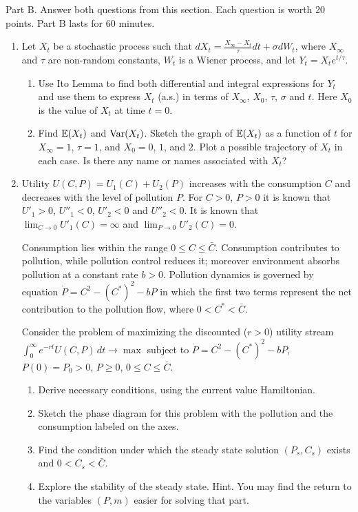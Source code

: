 \documentclass[pdftex,12pt,a4paper]{article}
\begin{document}
Part B.
Answer both questions from this section. Each question is worth 20 points.
Part B lasts for 60 minutes.
\begin{enumerate}[resume]
\item Let $X_t$ be a stochastic process such that
$dX_t=\frac{X_{\infty}-X_t}{\tau}dt+\sigma dW_t$, where $X_{\infty}$ and $\tau$ are non-random constants, $W_t$ is a Wiener process, and let $Y_t=X_t e^{t/\tau}$.
\begin{enumerate}
\item Use Ito Lemma to find both differential and integral expressions for $Y_t$ and use them to express $X_t$ (a.s.) in terms of $X_{\infty}$, $X_0$, $\tau$, $\sigma$ and $t$. Here $X_0$ is the value of $X_t$ at time $t=0$.
\item Find $\mathbb{E}(X_t)$ and $\operatorname{Var}(X_t)$. Sketch the graph of $\mathbb{E}(X_t)$ as a function of $t$ for $X_{\infty}=1$, $\tau=1$, and $X_0 = 0$, $1$, and $2$. Plot a possible trajectory of $X_t$ in each case. Is there any name or names associated with $X_t$? 
\end{enumerate}

\item Utility $U(C,P)=U_1(C)+U_2(P)$ increases with the consumption $C$ and decreases with the level of pollution $P$. For $C>0$, $P>0$ it is known that $U'_1>0$, $U''_1<0$, $U'_2<0$ and $U''_2<0$. It is known that $\lim_{C\to 0} U'_1(C)=\infty$ and $\lim_{P\to 0} U'_2(C)=0$. 

Consumption lies within the range $0\leq C\leq \bar{C}$. Consumption contributes to pollution, while pollution control reduces it; moreover environment absorbs pollution at a constant rate $b>0$.  Pollution dynamics is governed by equation $\dot{P}=C^2-(C^*)^2-bP$ in which the first two terms represent the net contribution to the pollution flow, where $0<C^*<\bar{C}$. 

Consider the problem of maximizing the discounted ($r>0$) utility stream  
$\int_0^{\infty}e^{-rt}U(C,P)\, dt \to \max$
subject to $\dot{P}=C^2-(C^*)^2-bP$, $P(0)=P_0>0$, $P\geq 0$, $0\leq C\leq \bar{C}$.
\begin{enumerate}
\item Derive necessary conditions, using the current value Hamiltonian.
\item Sketch the phase diagram for this problem with the pollution and the consumption labeled on the axes.
\item Find the condition under which the steady state solution $(P_s,C_s)$ exists and $0<C_s<\bar{C}$.
\item Explore the stability of the steady state. Hint. You may find the return to the variables $(P,m)$ easier for solving that part.
\end{enumerate}
\end{enumerate}
\end{document}
